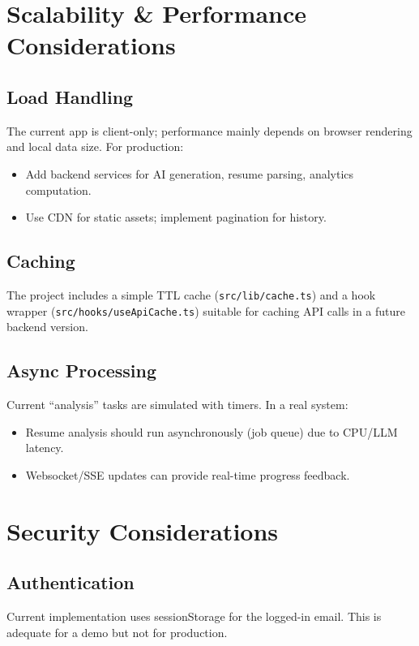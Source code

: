 \documentclass[11pt]{article}
\begin{document}
\section{Scalability \& Performance Considerations}

\subsection{Load Handling}
The current app is client-only; performance mainly depends on browser rendering and local data size. For production:
\begin{itemize}[leftmargin=1.2em]
  \item Add backend services for AI generation, resume parsing, analytics computation.
  \item Use CDN for static assets; implement pagination for history.
\end{itemize}

\subsection{Caching}
The project includes a simple TTL cache (\texttt{src/lib/cache.ts}) and a hook wrapper (\texttt{src/hooks/useApiCache.ts}) suitable for caching API calls in a future backend version.

\subsection{Async Processing}
Current ``analysis'' tasks are simulated with timers. In a real system:
\begin{itemize}[leftmargin=1.2em]
  \item Resume analysis should run asynchronously (job queue) due to CPU/LLM latency.
  \item Websocket/SSE updates can provide real-time progress feedback.
\end{itemize}

\section{Security Considerations}

\subsection{Authentication}
Current implementation uses sessionStorage for the logged-in email. This is adequate for a demo but not for production.
\end{document}
